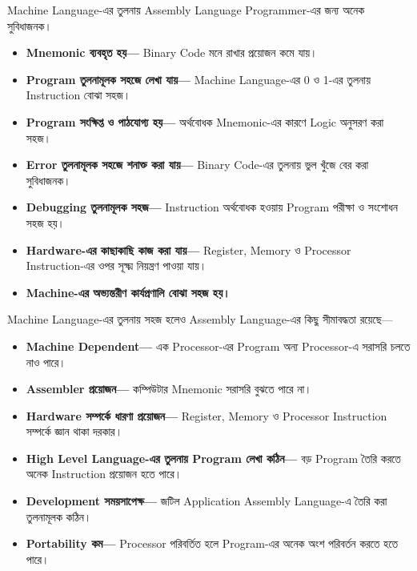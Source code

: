 Machine Language-এর তুলনায় Assembly Language Programmer-এর জন্য অনেক সুবিধাজনক।
\begin{itemize}
\item \textbf{Mnemonic ব্যবহৃত হয়—} Binary Code মনে রাখার প্রয়োজন কমে যায়।
\item \textbf{Program তুলনামূলক সহজে লেখা যায়—} Machine Language-এর 0 ও 1-এর তুলনায় Instruction বোঝা সহজ।
\item \textbf{Program সংক্ষিপ্ত ও পাঠযোগ্য হয়—} অর্থবোধক Mnemonic-এর কারণে Logic অনুসরণ করা সহজ।
\item \textbf{Error তুলনামূলক সহজে শনাক্ত করা যায়—} Binary Code-এর তুলনায় ভুল খুঁজে বের করা সুবিধাজনক।
\item \textbf{Debugging তুলনামূলক সহজ—} Instruction অর্থবোধক হওয়ায় Program পরীক্ষা ও সংশোধন সহজ হয়।
\item \textbf{Hardware-এর কাছাকাছি কাজ করা যায়—} Register, Memory ও Processor Instruction-এর ওপর সূক্ষ্ম নিয়ন্ত্রণ পাওয়া যায়।
\item \textbf{Machine-এর অভ্যন্তরীণ কার্যপ্রণালি বোঝা সহজ হয়।}
\end{itemize}

Machine Language-এর তুলনায় সহজ হলেও Assembly Language-এর কিছু সীমাবদ্ধতা রয়েছে—
\begin{itemize}
\item \textbf{Machine Dependent—} এক Processor-এর Program অন্য Processor-এ সরাসরি চলতে নাও পারে।
\item \textbf{Assembler প্রয়োজন—} কম্পিউটার Mnemonic সরাসরি বুঝতে পারে না।
\item \textbf{Hardware সম্পর্কে ধারণা প্রয়োজন—} Register, Memory ও Processor Instruction সম্পর্কে জ্ঞান থাকা দরকার।
\item \textbf{High Level Language-এর তুলনায় Program লেখা কঠিন—} বড় Program তৈরি করতে অনেক Instruction প্রয়োজন হতে পারে।
\item \textbf{Development সময়সাপেক্ষ—} জটিল Application Assembly Language-এ তৈরি করা তুলনামূলক কঠিন।
\item \textbf{Portability কম—} Processor পরিবর্তিত হলে Program-এর অনেক অংশ পরিবর্তন করতে হতে পারে।
\end{itemize}

